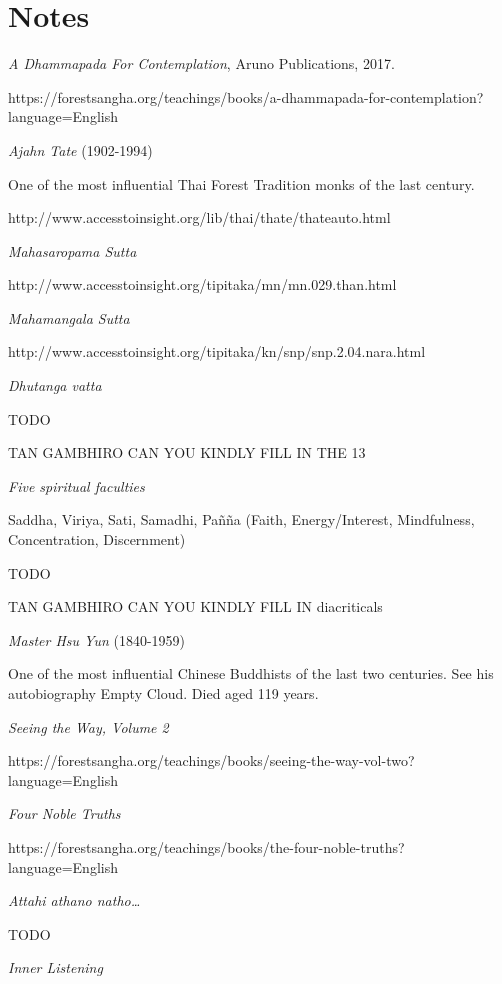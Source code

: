 \chapter{Notes}


 \emph{A Dhammapada For Contemplation}, Aruno Publications, 2017.

https://forestsangha.org/teachings/books/a-dhammapada-for-contemplation?language=English

 \emph{Ajahn Tate} (1902-1994)

One of the most influential Thai Forest Tradition monks of the last century.

http://www.accesstoinsight.org/lib/thai/thate/thateauto.html

 \emph{Mahasaropama Sutta}

http://www.accesstoinsight.org/tipitaka/mn/mn.029.than.html

 \emph{Mahamangala Sutta}

http://www.accesstoinsight.org/tipitaka/kn/snp/snp.2.04.nara.html

 \emph{Dhutanga vatta}

TODO

TAN GAMBHIRO CAN YOU KINDLY FILL IN THE 13

 \emph{Five spiritual faculties}

Saddha, Viriya, Sati, Samadhi, Pañña (Faith, Energy/Interest, Mindfulness, Concentration, Discernment)

TODO

TAN GAMBHIRO CAN YOU KINDLY FILL IN diacriticals

 \emph{Master Hsu Yun} (1840-1959)

One of the most influential Chinese Buddhists of the last two centuries. See his
autobiography Empty Cloud. Died aged 119 years.

 \emph{Seeing the Way, Volume 2}

https://forestsangha.org/teachings/books/seeing-the-way-vol-two?language=English

 \emph{Four Noble Truths}

https://forestsangha.org/teachings/books/the-four-noble-truths?language=English

 \emph{Attahi athano natho\ldots{}}

TODO

 \emph{Inner Listening}

